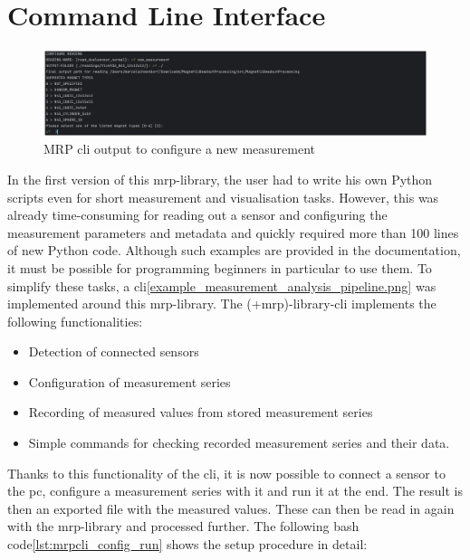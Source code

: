 \hypertarget{command-line-interface}{%
\section{Command Line Interface}\label{command-line-interface}}

\begin{figure}
\centering
\includegraphics{./generated_images/border_MRP_(+cli)_output_to_configure_a_new_measurement.png}
\caption{MRP \gls{cli} output to configure a new measurement
\label{MRP_(+cli)_output_to_configure_a_new_measurement.png}}
\end{figure}

In the first version of this \gls{mrp}-library, the user had to write
his own Python scripts even for short measurement and visualisation
tasks. However, this was already time-consuming for reading out a sensor
and configuring the measurement parameters and metadata and quickly
required more than 100 lines of new Python code. Although such examples
are provided in the documentation, it must be possible for programming
beginners in particular to use them. To simplify these tasks, a
\gls{cli}\ref{example_measurement_analysis_pipeline.png} was implemented
around this \gls{mrp}-library. The (+mrp)-library-\gls{cli} implements
the following functionalities:

\begin{itemize}
\tightlist
\item
  Detection of connected sensors
\item
  Configuration of measurement series
\item
  Recording of measured values from stored measurement series
\item
  Simple commands for checking recorded measurement series and their
  data.
\end{itemize}

Thanks to this functionality of the \gls{cli}, it is now possible to
connect a sensor to the \gls{pc}, configure a measurement series with it
and run it at the end. The result is then an exported file with the
measured values. These can then be read in again with the
\gls{mrp}-library and processed further. The following bash
code\ref{lst:mrpcli_config_run} shows the setup procedure in detail:

